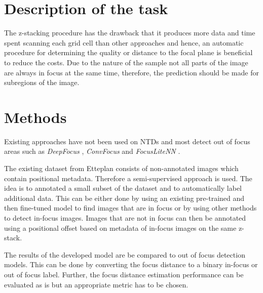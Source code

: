 \documentclass[a4paper,11pt]{article}
\begin{document}
\section{Description of the task}


The z-stacking procedure has the drawback that it produces more data and time spent scanning each grid cell than other approaches and hence, an automatic procedure for determining the quality or distance to the focal plane is beneficial to reduce the costs. Due to the nature of the sample not all parts of the image are always in focus at the same time, therefore, the prediction should be made for subregions of the image. 


\section{Methods}


Existing approaches have not been used on NTDs and most detect out of focus areas such as \emph{DeepFocus} \cite{senaras2018deepfocus}, \emph{ConvFocus} \cite{kohlberger2019wholeslide} and \emph{FocusLiteNN} \cite{wang2020focuslitenn}.

The existing dataset from Etteplan consists of non-annotated images which contain positional metadata. Therefore a semi-supervised approach is used. The idea is to annotated a small subset of the dataset and to automatically label additional data. This can be either done by using an existing pre-trained and then fine-tuned model to find images that are in focus or by using other methods to detect in-focus images. Images that are not in focus can then be annotated using a positional offset based on metadata of in-focus images on the same z-stack.

The results of the developed model are be compared to out of focus detection models. This can be done by converting the focus distance to a binary in-focus or out of focus label. Further, the focus distance estimation performance can be evaluated as is but an appropriate metric has to be chosen.
\end{document}

